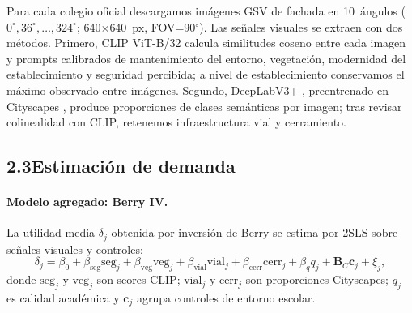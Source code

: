 \documentclass[12pt,a4paper]{article}
\begin{document}
Para cada colegio oficial descargamos imágenes GSV de fachada en 10~ángulos
($0^\circ,36^\circ,\ldots,324^\circ$; 640$\times$640~px, FOV=90$^\circ$). Las
señales visuales se extraen con dos métodos. Primero, CLIP ViT-B/32
\citep{Radford2021} calcula similitudes coseno entre cada imagen y prompts
calibrados de mantenimiento del entorno, vegetación, modernidad del establecimiento y seguridad percibida; a
nivel de establecimiento conservamos el máximo observado entre imágenes.
Segundo, DeepLabV3+ \citep{Chen2018DeepLab}, preentrenado en Cityscapes
\citep{Cordts2016}, produce proporciones de clases semánticas por imagen; tras
revisar colinealidad con CLIP, retenemos infraestructura vial y cerramiento.


\subsection*{2.3\quad Estimación de demanda}

\paragraph{Modelo agregado: Berry IV.}
La utilidad media $\delta_j$ obtenida por inversión de Berry se estima por 2SLS
sobre señales visuales y controles:
\begin{equation}
\delta_j =
\beta_0 + \beta_{\text{seg}}\text{seg}_j
+ \beta_{\text{veg}}\text{veg}_j
+ \beta_{\text{vial}}\text{vial}_j
+ \beta_{\text{cerr}}\text{cerr}_j
+ \beta_q q_j + \mathbf{B}_C\mathbf{c}_j + \xi_j ,
\label{eq:berry_iv}
\end{equation}
donde $\text{seg}_j$ y $\text{veg}_j$ son scores CLIP; $\text{vial}_j$ y
$\text{cerr}_j$ son proporciones Cityscapes; $q_j$ es calidad académica y
$\mathbf{c}_j$ agrupa controles de entorno escolar.
\end{document}
